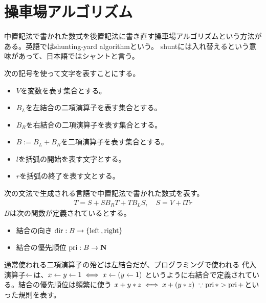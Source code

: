 \begingroup %
{\setlength\arraycolsep{2pt}
%
\section{操車場アルゴリズム}\label{s1:操車場アルゴリズム} %
	中置記法で書かれた数式を後置記法に書き直す操車場アルゴリズムという方法が
	ある。英語ではshunting-yard algorithmという。
	shuntには入れ替えるという意味があって、日本語ではシャントと言う。

	次の記号を使って文字を表すことにする。
	\begin{itemize}\setlength{\itemsep}{-1mm} %
		\item $V$を変数を表す集合とする。
		\item $B_L$を左結合の二項演算子を表す集合とする。
		\item $B_R$を右結合の二項演算子を表す集合とする。
		\item $B:=B_L+B_R$を二項演算子を表す集合とする。
		\item $l$を括弧の開始を表す文字とする。
		\item $r$を括弧の終了を表す文とする。
	\end{itemize} %
	次の文法で生成される言語で中置記法で書かれた数式を表す。
	\begin{equation}\label{eq:二項演算の文法}\begin{split}
		T = S + SB_RT + TB_LS,\quad S = V + lTr
	\end{split}\end{equation}
	$B$は次の関数が定義されているとする。
	\begin{itemize}\setlength{\itemsep}{-1mm} %
		\item 結合の向き $\mathinner{\operatorname{dir}}:B\to\mathinner{\{{\mathinner{\operatorname{left}},\mathinner{\operatorname{right}}}\}}$
		\item 結合の優先順位 $\mathinner{\operatorname{pri}}:B\to\mathbf{N}$
	\end{itemize} %
	通常使われる二項演算子の殆どは左結合だが、プログラミングで使われる
	代入演算子$\xleftarrow[{}]{}$は、$x\xleftarrow[{}]{}y\xleftarrow[{}]{}1\iff x\xleftarrow[{}]{}(y\xleftarrow[{}]{}1)$
	というように右結合で定義されている。結合の優先順位は頻繁に使う
	$x+y*z\iff x+(y*z)\;\because \mathinner{\operatorname{pri}}*>\mathinner{\operatorname{pri}}+$といった規則を表す。

}
